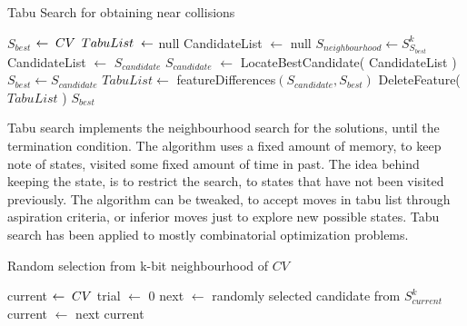 \begin{algorithm}[h]
  \caption{ Tabu Search for obtaining near collisions \cite{00036}}
  \begin{algorithmic}[1]
      \State $S_{best}$ $\gets \thickspace CV$
      \State $TabuList \thickspace \gets$ null
        \State CandidateList $\gets$ null
        \State $S_{neighbourhood} \gets S^{k}_{S_{best}}$
            \State CandidateList $\gets$ $S_{candidate}$
          \EndIf
        \EndFor
        \State $S_{candidate}$ $\gets$ LocateBestCandidate( CandidateList )
          \State $S_{best} \gets S_{candidate}$
          \State $TabuList \gets$ featureDifferences$(S_{candidate}, S_{best})$
            \State DeleteFeature( $TabuList$ )
          \EndWhile
        \EndIf
      \EndWhile 
      \State \Return $S_{best}$
    \EndFunction
  \end{algorithmic}
\end{algorithm}

Tabu search implements the neighbourhood search for the solutions, until the termination condition. The algorithm
uses a fixed amount of memory, to keep note of states, visited some fixed amount of time in past. The idea behind
keeping the state, is to restrict the search, to states that have not been visited previously. The algorithm can be
tweaked, to accept moves in tabu list through aspiration criteria, or inferior moves just to explore new possible
states. Tabu search has been applied to mostly combinatorial optimization problems\cite{00034, 00035}.

\begin{algorithm}[h]
  \caption{ Random selection from k-bit neighbourhood of $CV$ }
  \begin{algorithmic}[1]
      \State current $\gets \thickspace CV$
      \State trial $\gets$ 0
        \State next $\gets$ randomly selected candidate from $S^{k}_{current}$
          \State current $\gets$ next
        \EndIf
      \EndWhile 
      \State \Return current
    \EndFunction
  \end{algorithmic}
\end{algorithm}

